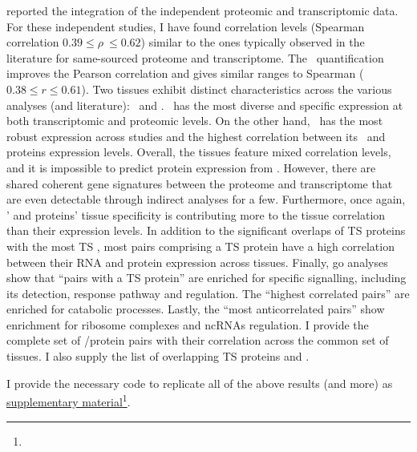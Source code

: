  reported
the integration of the independent proteomic and transcriptomic data.
For these independent studies,
I have found correlation levels
(Spearman correlation $0.39 ≤ \rho\ ≤ 0.62$)
similar to the ones typically observed in
the literature for same-sourced proteome and transcriptome.
The \PPKM\ quantification improves the Pearson correlation
and gives similar ranges to Spearman ($0.38 ≤ r ≤ 0.61$).
Two tissues exhibit distinct characteristics across the various analyses
(and literature): \Testis\ and \Liver.
\Testis\ has the most diverse and specific expression
at both transcriptomic and proteomic levels.
On the other hand, \Liver\ has the most robust expression across studies
and the highest correlation between its \mRNAs\ and proteins expression levels.
Overall, the tissues feature mixed correlation levels,
and it is impossible to predict protein expression from \mRNA{}.
However, there are shared coherent gene signatures
between the proteome and transcriptome
that are even detectable through indirect analyses for a few.
Furthermore, once again,
\mRNAs{}' and proteins' tissue specificity is contributing
more to the tissue correlation than their expression levels.
In addition to the significant overlaps of \gls{TS} proteins
with the most \gls{TS} \mRNAs,
most pairs comprising a \gls{TS} protein have
a high correlation between their RNA and protein expression across tissues.
Finally, \gls{go} analyses show that \enquote{pairs with a \gls{TS} protein}
are enriched for specific signalling,
including its detection, response pathway and regulation.
The \enquote{highest correlated pairs} are
enriched for catabolic processes.
Lastly, the \enquote{most anticorrelated pairs} show enrichment
for ribosome complexes and \glspl{ncRNA} regulation.
I provide the complete set of \mRNA/protein pairs with their correlation
across the common set of tissues.
I also supply the list of overlapping \gls{TS} proteins and \mRNAs{}.\mybr\

I provide the necessary code to replicate all of the above results (and more)
as \href{https://github.com/barzine/BaselineAtlas/tree/thesis.}{supplementary
material}\footnote{}.



